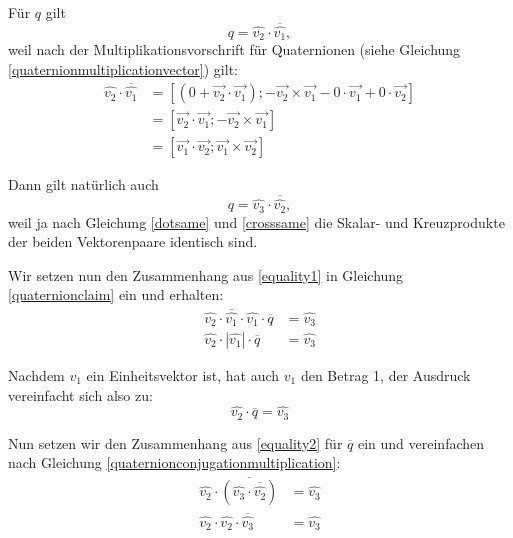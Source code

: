 Für $q$ gilt
\begin{equation}
 \label{equality1}
 q = \hat{v_2} \cdot \overline{\hat{v_1}},
\end{equation}
weil nach der Multiplikationsvorschrift für Quaternionen (siehe Gleichung \ref{quaternionmultiplicationvector}) gilt:
\begin{equation}
\begin{split}
 \hat{v_2} \cdot \overline{\hat{v_1}} &= \left[ \left( 0 + \vec{v_2} \cdot \vec{v_1} \right); - \vec{v_2} \times \vec{v_1} - 0 \cdot \vec{v_1} + 0 \cdot \vec{v_2} \right] \\
 &= \left[ \vec{v_2} \cdot \vec{v_1}; -\vec{v_2} \times \vec{v_1} \right] \\
 &= \left[ \vec{v_1} \cdot \vec{v_2}; \vec{v_1} \times \vec{v_2} \right]
\end{split}
\end{equation} 

Dann gilt natürlich auch
\begin{equation}
 \label{equality2}
 q = \hat{v_3} \cdot \overline{\hat{v_2}},
\end{equation} 
weil ja nach Gleichung \ref{dotsame} und \ref{crosssame} die Skalar- und Kreuzprodukte der beiden Vektorenpaare identisch sind.

Wir setzen nun den Zusammenhang aus \ref{equality1} in Gleichung \ref{quaternionclaim} ein und erhalten:
\begin{equation}
\begin{split}
 \label{step1}
 \hat{v_2} \cdot \overline{\hat{v_1}} \cdot \hat{v_1} \cdot \overline{q} &= \hat{v_3} \\
 \hat{v_2} \cdot \left| \hat{v_1} \right| \cdot \overline{q} &= \hat{v_3}
\end{split}
\end{equation}

Nachdem $v_1$ ein Einheitsvektor ist, hat auch $\hat{v_1}$ den Betrag 1, der Ausdruck vereinfacht sich also zu:
\begin{equation}
 \hat{v_2} \cdot \overline{q} = \hat{v_3}
\end{equation}

Nun setzen wir den Zusammenhang aus \ref{equality2} für $\overline{q}$ ein und vereinfachen nach Gleichung \ref{quaternionconjugationmultiplication}:
\begin{equation}
\begin{split}
 \label{step2}
 \hat{v_2} \cdot \overline{\left( \hat{v_3} \cdot \overline{\hat{v_2}} \right)} &= \hat{v_3} \\
 \hat{v_2} \cdot \hat{v_2} \cdot \overline{\hat{v_3}} &= \hat{v_3}
\end{split}
\end{equation}

